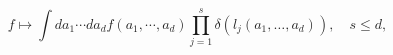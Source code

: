 \begin{equation}
\label{goodintegral}
f\mapsto
\int da_1\dotsm da_d f(a_1,\dotsm,a_d)\prod_{j=1}^s\delta(l_j(a_1,\dotsc,a_d)),
\quad s\leq d,
\end{equation}

